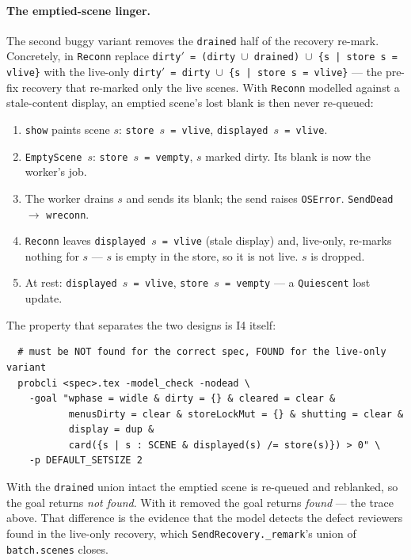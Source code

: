 \documentclass[a4paper,10pt,fleqn]{article}
\begin{document}
\paragraph{The emptied-scene linger.}
The second buggy variant removes the \texttt{drained} half of the recovery
re-mark.  Concretely, in \texttt{Reconn} replace
\texttt{dirty$'$ = (dirty $\cup$ drained) $\cup$ \{s | store~s = vlive\}}
with the live-only \texttt{dirty$'$ = dirty $\cup$ \{s | store~s = vlive\}}
--- the pre-fix recovery that re-marked only the live scenes.  With
\texttt{Reconn} modelled against a stale-content display, an emptied scene's
lost blank is then never re-queued:

\begin{enumerate}
  \item \texttt{show} paints scene $s$: \texttt{store~$s$ = vlive},
    \texttt{displayed~$s$ = vlive}.
  \item \texttt{EmptyScene}~$s$: \texttt{store~$s$ = vempty}, $s$ marked
    dirty.  Its blank is now the worker's job.
  \item The worker drains $s$ and sends its blank; the send raises
    \texttt{OSError}.  \texttt{SendDead} $\to$ \texttt{wreconn}.
  \item \texttt{Reconn} leaves \texttt{displayed~$s$ = vlive} (stale
    display) and, live-only, re-marks nothing for $s$ --- $s$ is empty in the
    store, so it is not live.  $s$ is dropped.
  \item At rest: \texttt{displayed~$s$ = vlive}, \texttt{store~$s$ = vempty}
    --- a \texttt{Quiescent} lost update.
\end{enumerate}

The property that separates the two designs is I4 itself:
\begin{verbatim}
  # must be NOT found for the correct spec, FOUND for the live-only variant
  probcli <spec>.tex -model_check -nodead \
    -goal "wphase = widle & dirty = {} & cleared = clear &
           menusDirty = clear & storeLockMut = {} & shutting = clear &
           display = dup &
           card({s | s : SCENE & displayed(s) /= store(s)}) > 0" \
    -p DEFAULT_SETSIZE 2
\end{verbatim}
With the \texttt{drained} union intact the emptied scene is re-queued and
reblanked, so the goal returns \emph{not found}.  With it removed the goal
returns \emph{found} --- the trace above.  That difference is the evidence
that the model detects the defect reviewers found in the live-only recovery,
which \texttt{SendRecovery.\_remark}'s union of \texttt{batch.scenes} closes.
\end{document}
